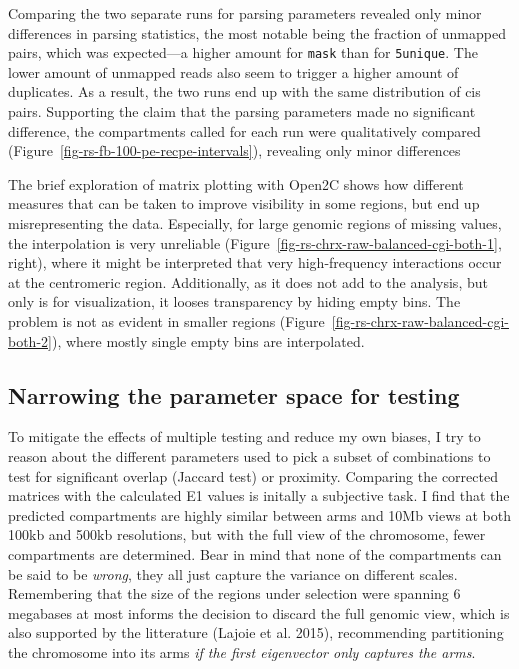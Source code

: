 \documentclass[
  11pt,
  a4paper,
]{scrbook}
\newcounter{none} %
\begin{document}
Comparing the two separate runs for parsing parameters revealed only
minor differences in parsing statistics, the most notable being the
fraction of unmapped pairs, which was expected---a higher amount for
\texttt{mask} than for \texttt{5unique}. The lower amount of unmapped
reads also seem to trigger a higher amount of duplicates. As a result,
the two runs end up with the same distribution of cis pairs. Supporting
the claim that the parsing parameters made no significant difference,
the compartments called for each run were qualitatively compared
(Figure~\ref{fig-rs-fb-100-pe-recpe-intervals}), revealing only minor
differences

The brief exploration of matrix plotting with Open2C shows how different
measures that can be taken to improve visibility in some regions, but
end up misrepresenting the data. Especially, for large genomic regions
of missing values, the interpolation is very unreliable
(Figure~\ref{fig-rs-chrx-raw-balanced-cgi-both-1}, right), where it
might be interpreted that very high-frequency interactions occur at the
centromeric region. Additionally, as it does not add to the analysis,
but only is for visualization, it looses transparency by hiding empty
bins. The problem is not as evident in smaller regions
(Figure~\ref{fig-rs-chrx-raw-balanced-cgi-both-2}), where mostly single
empty bins are interpolated.

\subsection{Narrowing the parameter space for
testing}\label{narrowing-the-parameter-space-for-testing}

To mitigate the effects of multiple testing and reduce my own biases, I
try to reason about the different parameters used to pick a subset of
combinations to test for significant overlap (Jaccard test) or
proximity. Comparing the corrected matrices with the calculated E1
values is initally a subjective task. I find that the predicted
compartments are highly similar between arms and 10Mb views at both
100kb and 500kb resolutions, but with the full view of the chromosome,
fewer compartments are determined. Bear in mind that none of the
compartments can be said to be \emph{wrong}, they all just capture the
variance on different scales. Remembering that the size of the regions
under selection were spanning 6 megabases at most informs the decision
to discard the full genomic view, which is also supported by the
litterature (Lajoie et al. 2015), recommending partitioning the
chromosome into its arms \emph{if the first eigenvector only captures
the arms}.
\end{document}
